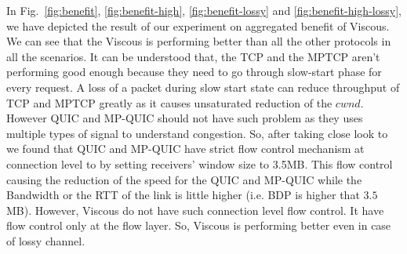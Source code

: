 In Fig.~\ref{fig:benefit}, \ref{fig:benefit-high}, \ref{fig:benefit-lossy} and \ref{fig:benefit-high-lossy}, we have depicted the result of our experiment on aggregated benefit of Viscous.
We can see that the Viscous is performing better than all the other protocols in all the scenarios. It can be understood that, the TCP and the MPTCP aren't performing good enough because they need to go through slow-start phase for every request. A loss of a packet during slow start state can reduce throughput of TCP and MPTCP greatly as it causes unsaturated reduction of the $cwnd$. However QUIC and MP-QUIC should not have such problem as they uses multiple types of signal to understand congestion. So, after taking close look to we found that QUIC and MP-QUIC have strict flow control mechanism at connection level to by setting receivers' window size to 3.5MB. This flow control causing the reduction of the speed for the QUIC and MP-QUIC while the Bandwidth or the RTT of the link is little higher (i.e. BDP is higher that $3.5$ MB). However, Viscous do not have such connection level flow control. It have flow control only at the flow layer. So, Viscous is performing better even in case of lossy channel.


